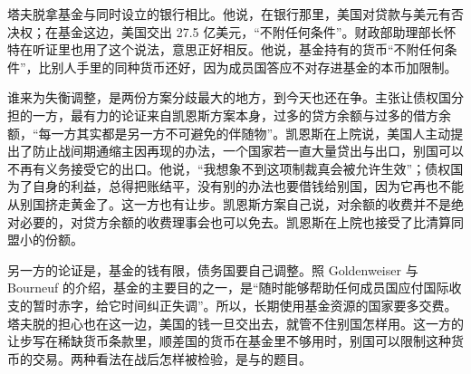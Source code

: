 塔夫脱拿基金与同时设立的银行相比。他说，在银行那里，美国对贷款与美元有否决权；在基金这边，美国交出 27.5 亿美元，“不附任何条件”\cite{senate1945}。财政部助理部长怀特在听证里也用了这个说法，意思正好相反。他说，基金持有的货币“不附任何条件”，比别人手里的同种货币还好，因为成员国答应不对存进基金的本币加限制\cite{senate1945}。

谁来为失衡调整，是两份方案分歧最大的地方，到今天也还在争。主张让债权国分担的一方，最有力的论证来自凯恩斯方案本身，过多的贷方余额与过多的借方余额，“每一方其实都是另一方不可避免的伴随物”\cite{frb1943}。凯恩斯在上院说，美国人主动提出了防止战间期通缩主因再现的办法，一个国家若一直大量贷出与出口，别国可以不再有义务接受它的出口\cite{hansard1944}。他说，“我想象不到这项制裁真会被允许生效”；债权国为了自身的利益，总得把账结平，没有别的办法也要借钱给别国，因为它再也不能从别国挤走黄金了\cite{hansard1944}。这一方也有让步。凯恩斯方案自己说，对余额的收费并不是绝对必要的，对贷方余额的收费理事会也可以免去\cite{frb1943}。凯恩斯在上院也接受了比清算同盟小的份额\cite{hansard1944}。

另一方的论证是，基金的钱有限，债务国要自己调整。照 Goldenweiser 与 Bourneuf 的介绍，基金的主要目的之一，是“随时能够帮助任何成员国应付国际收支的暂时赤字，给它时间纠正失调”。所以，长期使用基金资源的国家要多交费\cite{frb1944}。塔夫脱的担心也在这一边，美国的钱一旦交出去，就管不住别国怎样用\cite{senate1945}。这一方的让步写在稀缺货币条款里，顺差国的货币在基金里不够用时，别国可以限制这种货币的交易\cite{frb1944}。两种看法在战后怎样被检验，是与的题目。

